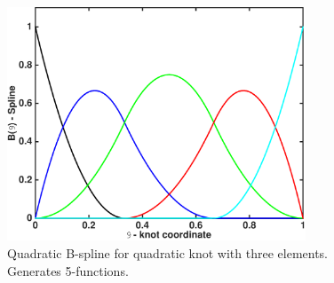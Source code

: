 \begin{figure}[t!]
\begin{center}

\includegraphics[width=3.5in]{figs/bspline_2_5}

\caption{Quadratic B-spline for quadratic knot with three elements. Generates
5-functions. \label{fig1b} }
\end{center}
\end{figure}


